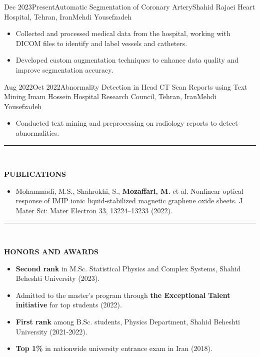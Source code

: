 \documentclass[11pt, b4paper]{cv}
\begin{document}
\begin{research_exp}{Dec 2023}{Present}{Automatic Segmentation of Coronary Artery}{Shahid Rajaei Heart Hospital, Tehran, Iran}{Mehdi Yousefzadeh}
	\begin{itemize}
        \item Collected and processed medical data from the hospital, working with DICOM files to identify and label vessels and catheters.
        \item Developed custom augmentation techniques to enhance data quality and improve segmentation accuracy.	\end{itemize}
	
\end{research_exp}
\vspace{-0.1in}

\begin{research_exp}{Aug 2022}{Oct 2022}{Abnormality Detection in Head CT Scan Reports using Text Mining
	}{Imam Hossein Hospital Research Council, Tehran, Iran}{Mehdi Yousefzadeh}
	
	\begin{itemize}
		\item Conducted text mining and preprocessing on radiology reports to detect abnormalities.
	\end{itemize}
\end{research_exp}
    

\vspace{-0.15in}
\rule{\textwidth}{1pt}\\
\vspace{-0.15in}

\textbf{PUBLICATIONS}
\vspace{-0.10in}

\begin{itemize}
	\item 	Mohammadi, M.S., Shahrokhi, S., \textbf{Mozaffari, M.} et al. Nonlinear optical response of IMIP ionic
	liquid-stabilized magnetic graphene oxide sheets. J Mater Sci: Mater Electron 33, 13224–13233
	(2022).
\end{itemize}


\vspace{-0.15in}
\rule{\textwidth}{1pt}\\
\vspace{-0.15in}

\textbf{HONORS AND AWARDS}
\vspace{-0.10in}

\begin{itemize}
    \item \textbf{Second rank} in M.Sc. Statistical Physics and Complex Systems, Shahid Beheshti University (2023).
	\item Admitted to the master’s program through \textbf{the Exceptional Talent initiative} for top students (2022).
	\item \textbf{First rank} among B.Sc. students, Physics Department, Shahid Beheshti University (2021-2022).
    \item \textbf{Top 1\%} in nationwide university entrance exam in Iran (2018).
\end{itemize}
\end{document}
